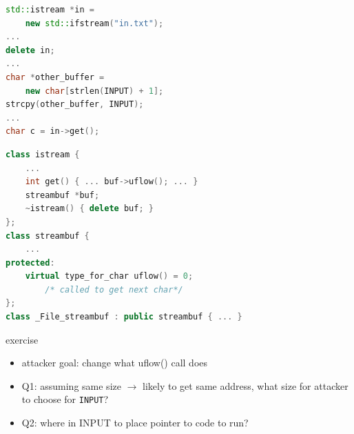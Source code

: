 \newsavebox{\uafExerciseCodeA}
\begin{lrbox}{\uafExerciseCodeA}
\begin{lstlisting}[language=C++,style=script]
std::istream *in =
    new std::ifstream("in.txt");
...
delete in;
...
char *other_buffer =
    new char[strlen(INPUT) + 1];
strcpy(other_buffer, INPUT);
...
char c = in->get();
\end{lstlisting}
\end{lrbox}
\newsavebox{\uafExerciseCodeB}
\begin{lrbox}{\uafExerciseCodeB}
\begin{lstlisting}[language=C++,style=script]
class istream {
    ...
    int get() { ... buf->uflow(); ... }
    streambuf *buf;
    ~istream() { delete buf; }
};
class streambuf {
    ...
protected:
    virtual type_for_char uflow() = 0;
        /* called to get next char*/
};
class _File_streambuf : public streambuf { ... }
\end{lstlisting}
\end{lrbox}

\begin{frame}[fragile,label=uafExericse]{exercise}
\begin{itemize}
\item attacker goal: change what uflow() call does
\item Q1: {\small assuming same size $\rightarrow$ likely to get same address}, what size for attacker to choose for \texttt{INPUT}?
\item Q2: where in INPUT to place pointer to code to run?
\end{itemize}
\end{frame}
